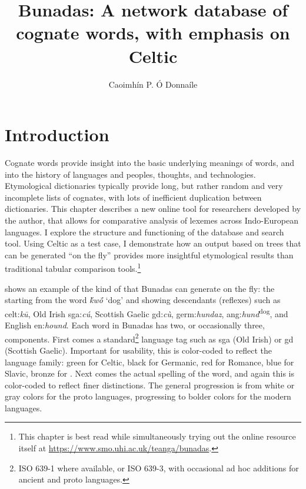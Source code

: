 \documentclass[output=paper,colorlinks,citecolor=brown]{langscibook}
\title{Bunadas: A network database of cognate words, with emphasis on Celtic}
\author{Caoimhín P. Ó Donnaíle\affiliation{Sabhal Mòr Ostaig}}
\begin{document}
\maketitle

\section{Introduction}

Cognate words provide insight into the basic underlying meanings of words, and into the history of languages and peoples, thoughts, and technologies. Etymological dictionaries typically provide long, but rather random and very incomplete lists of cognates, with lots of inefficient duplication between dictionaries. This chapter describes a new online tool for researchers developed by the author, that allows for comparative analysis of lexemes across Indo-European languages. I explore the structure and functioning of the database and search tool. Using Celtic as a test case, I demonstrate how an output based on trees that can be generated ``on the fly” provides more insightful etymological results than traditional tabular comparison tools.\footnote{This chapter is best read while simultaneously trying out the online resource itself at \url{https://www.smo.uhi.ac.uk/teanga/bunadas}.}

 shows an example of the kind of   that Bunadas can generate on the fly: the  starting from the  word \textit{ḱwṓ} ‘dog’ and showing descendants (reflexes) such as  celt:\textit{kū}, Old Irish sga:\textit{cú}, Scottish Gaelic gd:\textit{cù},  germ:\textit{hundaz},  ang:\textit{hund}\textsuperscript{dog}, and English en:\textit{hound}. Each word in Bunadas has two, or occasionally three, components. First comes a standard\footnote{ISO 639-1 where available, or ISO 639-3, with occasional ad hoc additions for ancient and proto languages.} language tag such as sga (Old Irish) or gd (Scottish Gaelic). Important for usability, this is color\hyp coded to reflect the language family: green for Celtic, black for Germanic, red for Romance, blue for Slavic, bronze for . Next comes the actual spelling of the word, and again this is color-coded to reflect finer distinctions. The general progression is from white or gray colors for the proto languages, progressing to bolder colors for the modern languages.
\end{document}
